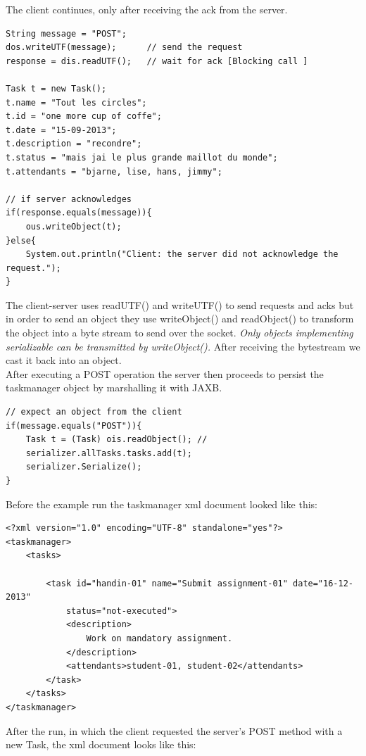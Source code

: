 The client continues, only after receiving the ack from the server.
\begin{lstlisting}[caption=client request and wait for ack]
String message = "POST";
dos.writeUTF(message);		// send the request
response = dis.readUTF();	// wait for ack [Blocking call ]

Task t = new Task();
t.name = "Tout les circles";
t.id = "one more cup of coffe";
t.date = "15-09-2013";	
t.description = "recondre";
t.status = "mais jai le plus grande maillot du monde";
t.attendants = "bjarne, lise, hans, jimmy";

// if server acknowledges
if(response.equals(message)){
   	ous.writeObject(t);
}else{
   	System.out.println("Client: the server did not acknowledge the request.");
}
\end{lstlisting}

The client-server uses readUTF() and writeUTF() to send requests and acks but in order to send an object they use writeObject() and readObject() to transform the object into a byte stream to send over the socket. \textit{Only objects implementing serializable can be transmitted by writeObject().} After receiving the bytestream we cast it back into an object.\\

After executing a POST operation the server then proceeds to persist the taskmanager object by marshalling it with JAXB.

\begin{lstlisting}[caption=server POST]
// expect an object from the client
if(message.equals("POST")){   
	Task t = (Task) ois.readObject(); // 
	serializer.allTasks.tasks.add(t);
    serializer.Serialize();	
}
\end{lstlisting}

Before the example run the taskmanager xml document looked like this:

\begin{lstlisting}[caption=xml before run]
<?xml version="1.0" encoding="UTF-8" standalone="yes"?>
<taskmanager>
	<tasks>
		
		<task id="handin-01" name="Submit assignment-01" date="16-12-2013"
			status="not-executed">
			<description>
				Work on mandatory assignment.
			</description>
			<attendants>student-01, student-02</attendants>
		</task>	
	</tasks>
</taskmanager>

\end{lstlisting}

After the run, in which the client requested the server's POST method with a new Task, the xml document looks like this:

